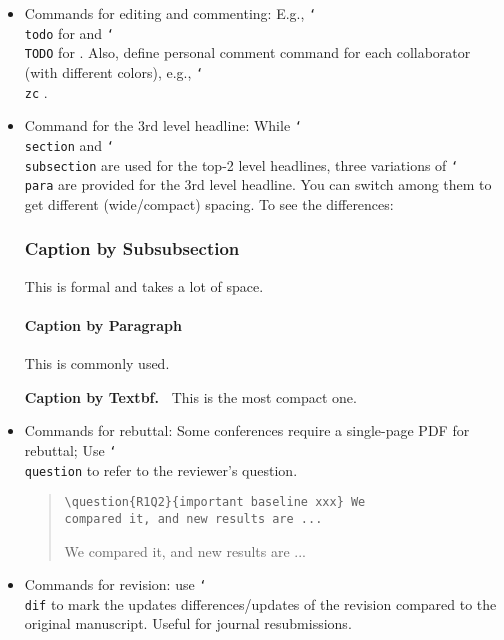 \begin{itemize}
  \item
    Commands for editing and commenting:
    E.g., \texttt{\char`\\todo} for  and \texttt{\char`\\TODO} for .
    Also, define personal comment command for each collaborator (with different colors), e.g., \texttt{\char`\\zc} .

  \item Command for the 3rd level headline:
    While \texttt{\char`\\section} and \texttt{\char`\\subsection} are used for the top-2 level headlines,
    three variations of \texttt{\char`\\para} are provided for the 3rd level headline.
    You can switch among them to get different (wide/compact) spacing. To see the differences:

  {
    \hrulefill

      \subsubsection{Caption by Subsubsection} This is formal and takes a lot of space.

      \paragraph{Caption by Paragraph} This is commonly used.

      \noindent\textbf{Caption by Textbf.\ } This is the most compact one.

    \hrulefill
  }

  \item Commands for rebuttal: Some conferences require a single-page PDF for rebuttal; Use \texttt{\char`\\question} to refer to the reviewer's question.
  \begin{quote}\begin{scriptsize}
    \begin{verbatim}
\question{R1Q2}{important baseline xxx} We
compared it, and new results are ...
    \end{verbatim}
     We compared it, and new results are ...
  \end{scriptsize}\end{quote}

  \item Commands for revision: use \texttt{\char`\\dif} to mark the updates differences/updates of the revision compared to the original manuscript. Useful for journal resubmissions.

\end{itemize} 
